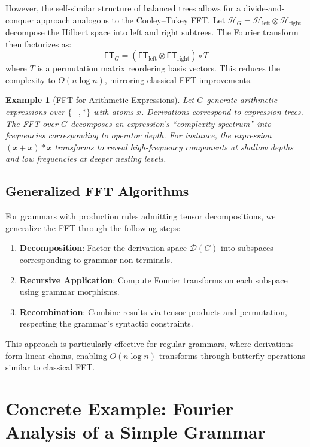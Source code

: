 \documentclass[11pt]{article}
\newtheorem{example}{Example}[section]
\begin{document}
However, the self-similar structure of balanced trees allows for a divide-and-conquer approach analogous to the Cooley--Tukey FFT. Let \( \mathcal{H}_G = \mathcal{H}_{\text{left}} \otimes \mathcal{H}_{\text{right}} \) decompose the Hilbert space into left and right subtrees. The Fourier transform then factorizes as:
\[
\mathsf{FT}_G = (\mathsf{FT}_{\text{left}} \otimes \mathsf{FT}_{\text{right}}) \circ T
\]
where \( T \) is a permutation matrix reordering basis vectors. This reduces the complexity to \( O(n \log n) \), mirroring classical FFT improvements.

\begin{example}[FFT for Arithmetic Expressions]
Let \( G \) generate arithmetic expressions over \(\{+, *\}\) with atoms \( x \). Derivations correspond to expression trees. The FFT over \( G \) decomposes an expression's ``complexity spectrum'' into frequencies corresponding to operator depth. For instance, the expression \( (x + x) * x \) transforms to reveal high-frequency components at shallow depths and low frequencies at deeper nesting levels.
\end{example}

\subsection{Generalized FFT Algorithms}
For grammars with production rules admitting tensor decompositions, we generalize the FFT through the following steps:
\begin{enumerate}
    \item \textbf{Decomposition}: Factor the derivation space \( \mathcal{D}(G) \) into subspaces corresponding to grammar non-terminals.
    \item \textbf{Recursive Application}: Compute Fourier transforms on each subspace using grammar morphisms.
    \item \textbf{Recombination}: Combine results via tensor products and permutation, respecting the grammar's syntactic constraints.
\end{enumerate}

This approach is particularly effective for regular grammars, where derivations form linear chains, enabling \( O(n \log n) \) transforms through butterfly operations similar to classical FFT.

\section{Concrete Example: Fourier Analysis of a Simple Grammar}
\label{sec:example}
\end{document}
